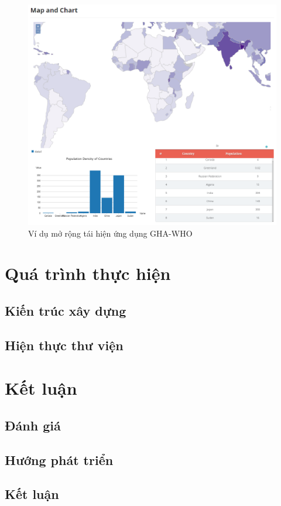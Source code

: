 \documentclass[12pt,a4paper]{article}
\begin{document}
\begin{figure}[htp]
	\begin{center}
    \includegraphics[scale=.6]{image/advance_1}
    \caption{Ví dụ mở rộng tái hiện ứng dụng GHA-WHO}
    \label{fig:advance_1}
	\end{center}
\end{figure}
\newpage
\section{Quá trình thực hiện}
\subsection{Kiến trúc xây dựng}
\subsection{Hiện thực thư viện}
\newpage
\section{Kết luận}
\subsection{Đánh giá}
\subsection{Hướng phát triển}
\subsection{Kết luận}
\newpage



\end{document}
